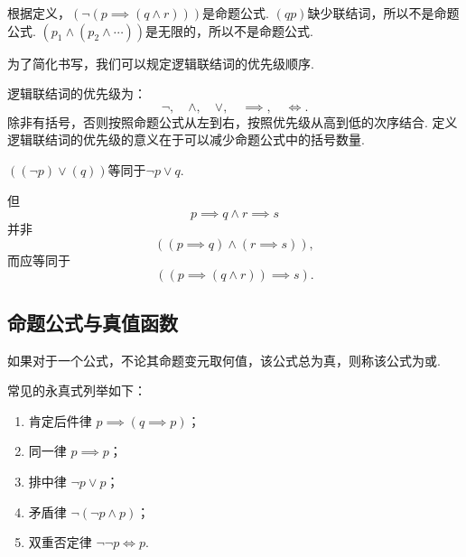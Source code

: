 \begin{example}
根据定义，\((\neg(p \implies (q \land r)))\)是命题公式.
\((qp)\)缺少联结词，所以不是命题公式.
\((p_1 \land (p_2 \land \dotsb))\)是无限的，所以不是命题公式.
\end{example}

为了简化书写，我们可以规定逻辑联结词的优先级顺序.
\begin{axiom}
逻辑联结词的优先级为：\[
\neg,\quad \land,\quad \lor,\quad \implies,\quad \iff.
\]除非有括号，否则按照命题公式从左到右，按照优先级从高到低的次序结合.
定义逻辑联结词的优先级的意义在于可以减少命题公式中的括号数量.
\end{axiom}

\begin{example}
\(((\neg p) \lor (q))\)等同于\(\neg p \lor q\).

但\[
p \implies q \land r \implies s
\]并非\[
((p \implies q) \land (r \implies s)),
\]而应等同于\[
((p \implies (q \land r)) \implies s).
\]
\end{example}

\subsection{命题公式与真值函数}





\begin{definition}
如果对于一个公式，不论其命题变元取何值，该公式总为真，则称该公式为或.
\end{definition}

\begin{example}
常见的永真式列举如下：\begin{enumerate}
\item 肯定后件律 \(p \implies (q \implies p)\)；
\item 同一律 \(p \implies p\)；
\item 排中律 \(\neg p \lor p\)；
\item 矛盾律 \(\neg(\neg p \land p)\)；
\item 双重否定律 \(\neg\neg p \iff p\).
\end{enumerate}
\end{example}
